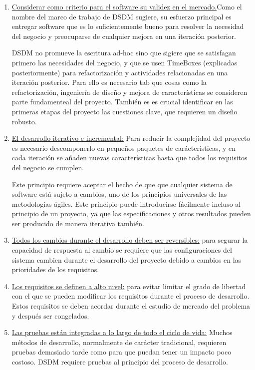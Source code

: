 \documentclass[12pt,a4paper]{article}
\begin{document}
\begin{enumerate}
\item \underline{Considerar como criterio para el software su validez en el mercado.}Como el nombre del marco de trabajo de DSDM sugiere, su esfuerzo principal es entregar
software que es lo suficientemente bueno para resolver la necesidad del negocio y preocuparse de cualquier mejora en una iteración posterior.


 DSDM no promueve la escritura ad-hoc sino que sigiere que se satisfagan  primero las necesidades del negocio, y que se usen TimeBoxes (explicadas posteriormente) para
refactorización y actividades relacionadas en una iteración posterior. Para ello es necesario tab que cosas como  la refactorización, ingeniería de diseño y mejora de características se consideren parte fundamenteal del proyecto. También es es crucial identificar en las primeras etapas del proyecto las cuestiones clave, que requieren un diseño robusto. 




\item \underline{El desarrollo iterativo e incremental:} 
Para reducir la complejidad del proyecto es necesario descomponerlo en pequeños paquetes de  carácteristicas, y en cada iteración se añaden nuevas características hasta que todos los requisitos del negocio se cumplen.

 Este principio requiere aceptar el hecho de que que cualquier sistema de software está sujeto a cambios, uno de los principios universales de las metodologías ágiles. Este principio puede introducirse fácilmente incluso al principio de un proyecto, ya que las especificaciones y otros resultados pueden ser producido de manera iterativa también. 


\item  \underline{Todos los cambios durante el desarrollo deben ser reversibles:} para segurar la capacidad de respuesta al cambio se requiere que las configuraciones del sistema cambien durante el desarrollo del proyecto debido a cambios en las prioridades de los requisitos.



\item \underline{Los requisitos se definen a alto nivel:} para evitar limitar el grado de libertad con el que se pueden modificar los requisitos durante el proceso de desarrollo.  Estos requisitos se deben acordar durante el estudio de mercado del problema y después ser congelados.

\item  \underline{Las pruebas están integradas a lo largo de todo el ciclo de vida:} Muchos métodos de desarrollo, normalmente de carácter tradicional, requieren pruebas demasiado tarde como para que puedan tener un impacto poco costoso. DSDM requiere pruebas al principio del proceso de desarrollo. 



\end{enumerate}
\end{document}
